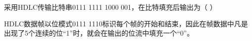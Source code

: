 \question 采用HDLC传输比特串0111 1111 1000 001，在比特填充后输出为（ ）
\par{}
\begin{solution}HDLC数据帧以位模式0111
1110标识每个帧的开始和结束，因此在帧数据中凡是出现了5个连续的位``1''时，就会在输出的位流中填充一个``0''。
\end{solution}

